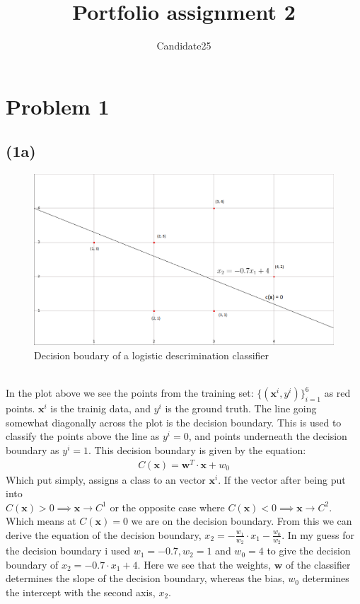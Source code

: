 \documentclass[12pt, letterpaper]{article}
\title{Portfolio assignment 2}
\author{Candidate25}
\date{}
\newcommand{\bs}{\boldsymbol}
\newcommand{\mbf}{\mathbf}
\begin{document}
  \section*{Problem 1}
    \subsection*{(1a)}
      \begin{figure}[h]
        \caption{Decision boudary of a logistic descrimination classifier}
        \centering
        \includegraphics[width=\textwidth,keepaspectratio=true,height=\textheight-\the\textundbildtextheight]{decisionboundary_1a}
      \end{figure}\\
      In the plot above we see the points from the training set: $\{(\mbf{x}^i, y^i)\}_{i=1}^6$ as red points. $\mbf{x}^i$ is the trainig data, and $y^i$ is the ground truth. The line going somewhat diagonally across the plot is the decision boundary. This is used to classify the points above the line as $y^i = 0$, and points underneath the decision boundary as $y^i = 1$. This decision boundary is given by the equation:
      \begin{align} \label{eq1}
        C(\mbf{x}) = \bs{w}^T \cdot \mbf{x} + w_0
      \end{align}
      Which put simply, assigns a class to an vector $\mbf{x}^i$. If the vector after being put into\\ $C(\mbf{x}) > 0 \implies \mbf{x} \rightarrow C^1$ or the opposite case where $C(\mbf{x}) < 0 \implies \mbf{x} \rightarrow C^2$. Which means at $C(\mbf{x}) = 0$ we are on the decision boundary. From this we can derive the equation of the decision boundary, $x_2 = -\frac{w_1}{w_2}\cdot x_1 - \frac{w_0}{w_2}$. In my guess for the decision boundary i used $w_1 = -0.7, w_2 = 1$ and $ w_0 = 4$ to give the decision boundary of $x_2 = -0.7 \cdot x_1 + 4$. Here we see that the weights, $\bs{w}$ of the classifier determines the slope of the decision boundary, whereas the bias, $w_0$ determines the intercept with the second axis, $x_2$.\\
\end{document}
